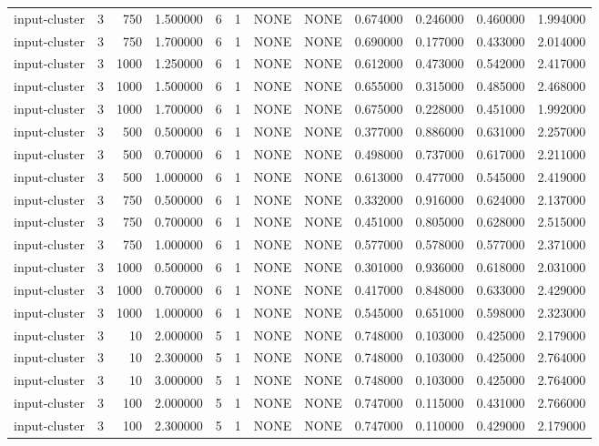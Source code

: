 \begin{tabular}{lrrrllllrrrr}
input-cluster & 3 & 750 & 1.500000 & 6 & 1 & NONE & NONE & 0.674000 & 0.246000 & 0.460000 & 1.994000 \\
input-cluster & 3 & 750 & 1.700000 & 6 & 1 & NONE & NONE & 0.690000 & 0.177000 & 0.433000 & 2.014000 \\
input-cluster & 3 & 1000 & 1.250000 & 6 & 1 & NONE & NONE & 0.612000 & 0.473000 & 0.542000 & 2.417000 \\
input-cluster & 3 & 1000 & 1.500000 & 6 & 1 & NONE & NONE & 0.655000 & 0.315000 & 0.485000 & 2.468000 \\
input-cluster & 3 & 1000 & 1.700000 & 6 & 1 & NONE & NONE & 0.675000 & 0.228000 & 0.451000 & 1.992000 \\
input-cluster & 3 & 500 & 0.500000 & 6 & 1 & NONE & NONE & 0.377000 & 0.886000 & 0.631000 & 2.257000 \\
input-cluster & 3 & 500 & 0.700000 & 6 & 1 & NONE & NONE & 0.498000 & 0.737000 & 0.617000 & 2.211000 \\
input-cluster & 3 & 500 & 1.000000 & 6 & 1 & NONE & NONE & 0.613000 & 0.477000 & 0.545000 & 2.419000 \\
input-cluster & 3 & 750 & 0.500000 & 6 & 1 & NONE & NONE & 0.332000 & 0.916000 & 0.624000 & 2.137000 \\
input-cluster & 3 & 750 & 0.700000 & 6 & 1 & NONE & NONE & 0.451000 & 0.805000 & 0.628000 & 2.515000 \\
input-cluster & 3 & 750 & 1.000000 & 6 & 1 & NONE & NONE & 0.577000 & 0.578000 & 0.577000 & 2.371000 \\
input-cluster & 3 & 1000 & 0.500000 & 6 & 1 & NONE & NONE & 0.301000 & 0.936000 & 0.618000 & 2.031000 \\
input-cluster & 3 & 1000 & 0.700000 & 6 & 1 & NONE & NONE & 0.417000 & 0.848000 & 0.633000 & 2.429000 \\
input-cluster & 3 & 1000 & 1.000000 & 6 & 1 & NONE & NONE & 0.545000 & 0.651000 & 0.598000 & 2.323000 \\
input-cluster & 3 & 10 & 2.000000 & 5 & 1 & NONE & NONE & 0.748000 & 0.103000 & 0.425000 & 2.179000 \\
input-cluster & 3 & 10 & 2.300000 & 5 & 1 & NONE & NONE & 0.748000 & 0.103000 & 0.425000 & 2.764000 \\
input-cluster & 3 & 10 & 3.000000 & 5 & 1 & NONE & NONE & 0.748000 & 0.103000 & 0.425000 & 2.764000 \\
input-cluster & 3 & 100 & 2.000000 & 5 & 1 & NONE & NONE & 0.747000 & 0.115000 & 0.431000 & 2.766000 \\
input-cluster & 3 & 100 & 2.300000 & 5 & 1 & NONE & NONE & 0.747000 & 0.110000 & 0.429000 & 2.179000 \\

\end{tabular}
